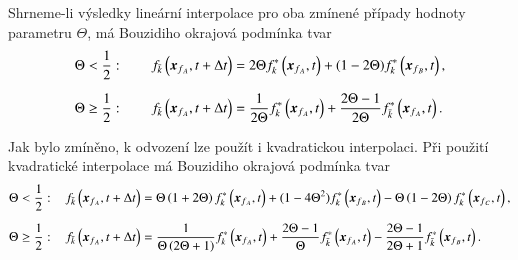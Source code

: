 Shrneme-li výsledky lineární interpolace pro oba zmínené případy hodnoty parametru $ \Theta $, má Bouzidiho okrajová podmínka tvar
\begin{align}\label{eq:lbouz}
\begin{split}
\Theta &< \dfrac{1}{2}: \hspace{7mm} 
f_{\bar{k}}\left(\vec{x}_{f{_A}}, t+\Delta t\right) = 2 \Theta f_{k}^{*}\left(\vec{x}_{f{_A}}, t\right)+(1-2 \Theta) f_{k}^{*}\left(\vec{x}_{f{_B}}, t\right),\\[6pt]
\Theta &\geq \dfrac{1}{2}: \hspace{7mm} f_{\bar{k}}\left(\vec{x}_{f{_A}}, t+\Delta t\right) = \frac{1}{2 \Theta} f_{k}^{*}\left(\vec{x}_{f{_A}}, t\right)+\frac{2 \Theta-1}{2 \Theta} f_{\bar{k}}^{*}\left(\vec{x}_{f{_A}}, t\right).
\end{split}
\end{align}

Jak bylo zmíněno, k odvození lze použít i kvadratickou interpolaci. Při použití kvadratické interpolace má Bouzidiho okrajová podmínka tvar
\begin{align}\label{eq:qbouz}
\begin{split}
\Theta &< \dfrac{1}{2}: \hspace{3mm} 
f_{\bar{k}}\left(\vec{x}_{f{_A}}, t+\Delta t\right) =
\Theta \left( 1 + 2\Theta \right) f_{k}^{*}\left(\vec{x}_{f{_A}}, t\right)+
(1-4 \Theta^2) f_{k}^{*}\left(\vec{x}_{f{_B}}, t\right)-
\Theta \left( 1 - 2\Theta \right) f_{k}^{*}\left(\vec{x}_{f{_C}}, t\right),\\[6pt]
\Theta &\geq \dfrac{1}{2}: \hspace{3mm}
f_{\bar{k}}\left(\vec{x}_{f{_A}}, t+\Delta t\right) =
\frac{1}{\Theta \left(2 \Theta + 1\right)} f_{k}^{*}\left(\vec{x}_{f{_A}}, t\right) +
\frac{2\Theta - 1}{\Theta} f_{\bar{k}}^{*}\left(\vec{x}_{f{_A}}, t\right) -
\frac{2\Theta - 1}{2 \Theta + 1} f_{\bar{k}}^{*}\left(\vec{x}_{f{_B}}, t\right).
\end{split}
\end{align}

